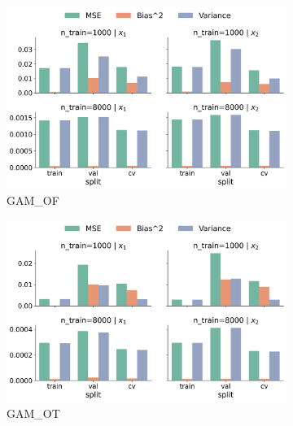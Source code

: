 \documentclass[runningheads]{llncs}
\begin{document}
\begin{figure}[ht!]
    \centering
    \begin{subfigure}[b]{0.49\textwidth}
        \includegraphics[width=\textwidth]{img/SNC/feature_effect_errors_ale_GAM_OF.png}
        \caption{GAM\_OF}
        \label{fig:ale-results-snc-gam-of}  %
    \end{subfigure}
    \hfill
    \begin{subfigure}[b]{0.49\textwidth}
        \includegraphics[width=\textwidth]{img/SNC/feature_effect_errors_ale_GAM_OT.png}
        \caption{GAM\_OT}
        \label{fig:ale-results-snc-gam-ot}  %
    \end{subfigure}
    \\[10pt]
    \vfill
    \begin{subfigure}[b]{0.49\textwidth}

\end{subfigure}
\end{figure}
\end{document}
